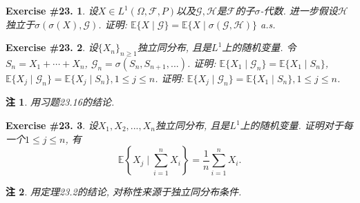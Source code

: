 \documentclass[UTF8, a4paper]{article}
\newtheorem{exercise}{Exercise \#23.}
\newtheorem*{remark}{注}
\begin{document}
\begin{exercise}
设\(X \in L^1(\Omega, \mathcal{F}, P)\)以及\(\mathcal{G}, \mathcal{H}\)是\(\mathcal{F}\)的子\(\sigma\)-代数.
进一步假设\(\mathcal{H}\)独立于\(\sigma(\sigma(X), \mathcal{G})\).
证明: \(\mathbb{E}\{X\mid \mathcal{G}\} = \mathbb{E}\{X\mid \sigma(\mathcal{G}, \mathcal{H})\}\) a.s.
\end{exercise}


\begin{exercise}
设\(\{X_n\}_{n\geq 1}\)独立同分布, 且是\(L^1\)上的随机变量.
令\(S_n = X_1 + \cdots + X_n\), \(\mathcal{G}_n = \sigma(S_n, S_{n+1}, ...)\).
证明: \(\mathbb{E}\{X_1 \mid \mathcal{G}_n\} = \mathbb{E}\{X_1 \mid S_n\}\), \(\mathbb{E}\{X_j \mid \mathcal{G}_n\} = \mathbb{E}\{X_j \mid S_n\}, 1 \leq j \leq n\).
证明: \(\mathbb{E}\{X_j \mid \mathcal{G}_n\} = \mathbb{E}\{X_1 \mid S_n\}, 1 \leq j \leq n\).
\end{exercise}
\begin{remark}
用习题23.16的结论.
\end{remark}



\begin{exercise}
设\(X_1, X_2, ..., X_n\)独立同分布, 且是\(L^1\)上的随机变量.
证明对于每一个\(1 \leq j\leq n\), 有
$$
\mathbb{E}\left\{X_j \mid \sum_{i = 1}^{n}X_i\right\} = \frac{1}{n} \sum_{i = 1}^{n} X_i.
$$
\end{exercise}

\begin{remark}
用定理23.2的结论, 对称性来源于独立同分布条件.
\end{remark}



\end{document}
